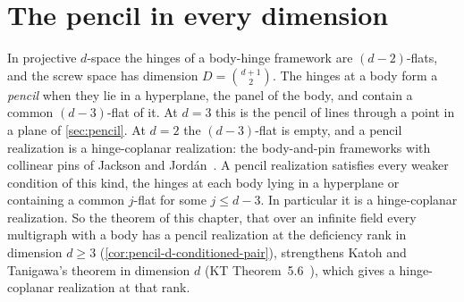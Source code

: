 \section{The pencil in every dimension}
\label{sec:pencil-d}

In projective $d$-space the hinges of a body-hinge framework are
$(d-2)$-flats, and the screw space has dimension $D = \binom{d+1}{2}$.
The hinges at a body form a \emph{pencil} when they lie in a hyperplane,
the panel of the body, and contain a common $(d-3)$-flat of it. At
$d = 3$ this is the pencil of lines through a point in a plane of
\cref{sec:pencil}. At $d = 2$ the $(d-3)$-flat is empty, and a pencil
realization is a hinge-coplanar realization: the body-and-pin frameworks
with collinear pins of Jackson and Jord\'an~\cite{jacksonJordan2008pin}.
A pencil realization satisfies every weaker condition of this kind, the
hinges at each body lying in a hyperplane or containing a common
$j$-flat for some $j \le d - 3$. In particular it is a hinge-coplanar
realization. So the theorem of this chapter, that over an infinite
field every multigraph with a body has a pencil realization at the
deficiency rank in dimension $d \ge 3$
(\cref{cor:pencil-d-conditioned-pair}), strengthens Katoh and
Tanigawa's theorem in dimension $d$ (KT
Theorem~5.6~\cite{katohTanigawa2011}), which gives a hinge-coplanar
realization at that rank.

